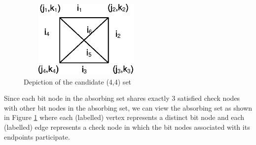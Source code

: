\begin{figure}
\center\includegraphics[width=2.65in,height=1.5in]{Drawing10_1.eps}
\caption{Depiction of the candidate (4,4) set} \label{fig44}
\end{figure}

Since each bit node in the absorbing set shares exactly 3
satisfied check nodes with other bit nodes in the absorbing set,
we can view the absorbing set as shown in Figure \ref{fig44} where
each (labelled) vertex represents a distinct bit node and each
(labelled) edge represents a check node in which the bit nodes
associated with its endpoints participate.


